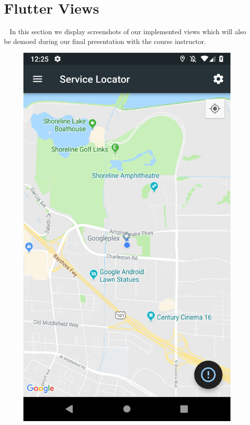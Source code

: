 \documentclass[10pt, a4paper]{article}
\begin{document}
\section{Flutter Views}
\par ~ In this section we display screenshots of our implemented views which will also be demoed during our final presentation with the course instructor.
\begin{figure}[H]
  \includegraphics[width=\linewidth]{final-diagrams/Emulator-Screenshots/Screenshot_1556126754.png}

\end{figure}
\end{document}
